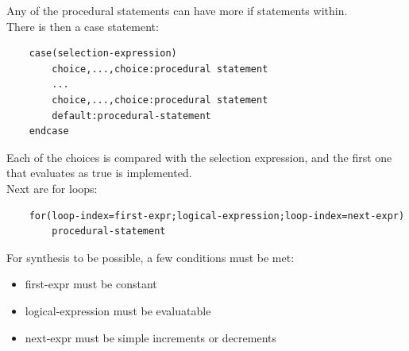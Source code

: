 \documentclass[nobib]{tufte-handout}
\begin{document}
\begin{itemize}
    Any of the procedural statements can have more if statements within.\\
    There is then a case statement:
    \begin{lstlisting}
    case(selection-expression)
        choice,...,choice:procedural statement
        ... 
        choice,...,choice:procedural statement
        default:procedural-statement
    endcase
    \end{lstlisting}
    Each of the choices is compared with the selection expression, and the first one that evaluates as true is implemented.\\
    Next are for loops:
    \begin{lstlisting}
    for(loop-index=first-expr;logical-expression;loop-index=next-expr)
        procedural-statement
    \end{lstlisting}
    For synthesis to be possible, a few conditions must be met:
    \begin{itemize}
        \item first-expr must be constant
        \item logical-expression must be evaluatable
        \item next-expr must be simple increments or decrements
    \end{itemize}

\end{itemize}
    
\end{document}
